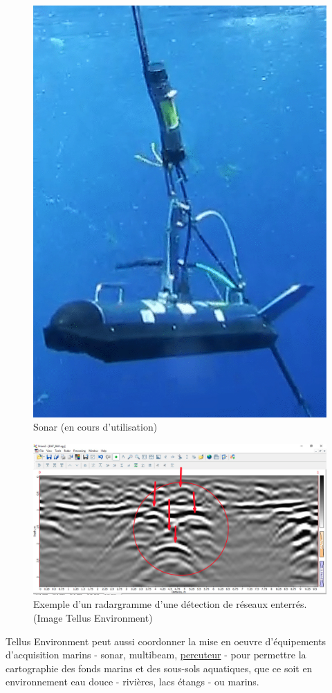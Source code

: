 \documentclass[12pt,a4paper]{report}
\begin{document}
\begin{figure}
\begin{minipage}{.5\textwidth}
			\includegraphics[width=0.7\linewidth]{img/sonar}
			\caption[sonar]{Sonar (en cours d'utilisation)}
			\label{fig:sonar}
		\end{minipage}
	\end{figure}
	
	\begin{figure}
		\centering
		\includegraphics[width=0.7\linewidth]{img/radargram}
		\caption[radargramme]{Exemple d'un radargramme d'une détection \hspace{\textwidth} de réseaux enterrés. (Image Tellus Environment)}
		\label{fig:radargram}
	\end{figure}
	
	\para Tellus Environment peut aussi coordonner la mise en oeuvre d'équipements d'acquisition marins - sonar, multibeam, \underline{percuteur}  - pour permettre la cartographie des fonds marins et des sous-sols aquatiques, que ce soit en environnement eau douce - rivières, lacs étangs - ou marins. 
	
\end{document}
